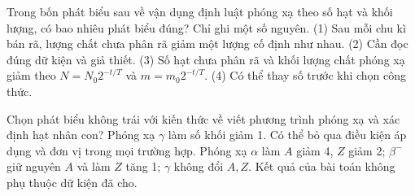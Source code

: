 \begin{ex}
Trong bốn phát biểu sau về vận dụng định luật phóng xạ theo số hạt và khối lượng, có bao nhiêu phát biểu đúng? Chỉ ghi một số nguyên. (1) Sau mỗi chu kì bán rã, lượng chất chưa phân rã giảm một lượng cố định như nhau. (2) Cần đọc đúng dữ kiện và giả thiết. (3) Số hạt chưa phân rã và khối lượng chất phóng xạ giảm theo $N=N_0 2^{-t/T}$ và $m=m_0 2^{-t/T}$. (4) Có thể thay số trước khi chọn công thức.
\end{ex}

\begin{ex}
Chọn phát biểu không trái với kiến thức về viết phương trình phóng xạ và xác định hạt nhân con?
\choice
{Phóng xạ $\gamma$ làm số khối giảm 1.}
{Có thể bỏ qua điều kiện áp dụng và đơn vị trong mọi trường hợp.}
{\True Phóng xạ $\alpha$ làm $A$ giảm 4, $Z$ giảm 2; $\beta^-$ giữ nguyên $A$ và làm $Z$ tăng 1; $\gamma$ không đổi $A,Z$.}
{Kết quả của bài toán không phụ thuộc dữ kiện đã cho.}
\end{ex}

